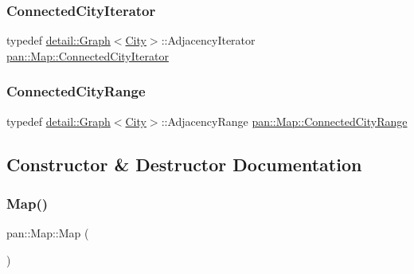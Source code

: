 \mbox{\label{classpan_1_1_map_a616bc40b1a3f76f046be7ddf44ba90df}} 
\subsubsection{\texorpdfstring{Connected\+City\+Iterator}{ConnectedCityIterator}}
{\footnotesize\ttfamily typedef \hyperlink{classpan_1_1detail_1_1_graph}{detail\+::\+Graph}$<$\hyperlink{classpan_1_1_city}{City}$>$\+::Adjacency\+Iterator \hyperlink{classpan_1_1_map_a616bc40b1a3f76f046be7ddf44ba90df}{pan\+::\+Map\+::\+Connected\+City\+Iterator}}

\mbox{\label{classpan_1_1_map_a6b1e81229ca2ed5c67202254948bde9b}} 
\subsubsection{\texorpdfstring{Connected\+City\+Range}{ConnectedCityRange}}
{\footnotesize\ttfamily typedef \hyperlink{classpan_1_1detail_1_1_graph}{detail\+::\+Graph}$<$\hyperlink{classpan_1_1_city}{City}$>$\+::Adjacency\+Range \hyperlink{classpan_1_1_map_a6b1e81229ca2ed5c67202254948bde9b}{pan\+::\+Map\+::\+Connected\+City\+Range}}



\subsection{Constructor \& Destructor Documentation}
\mbox{\label{classpan_1_1_map_a11ad1a3ad71e540b3f0c99f345e03e48}} 
\subsubsection{\texorpdfstring{Map()}{Map()}\hspace{0.1cm}{\footnotesize\ttfamily [1/4]}}
{\footnotesize\ttfamily pan\+::\+Map\+::\+Map (\begin{DoxyParamCaption}{ }\end{DoxyParamCaption})}



